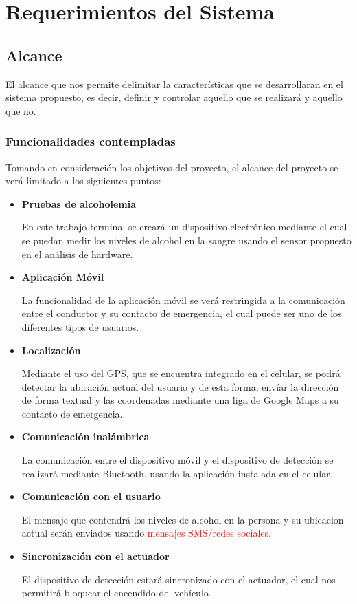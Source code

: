 \section{Requerimientos del Sistema}
\subsection{Alcance}
El alcance que nos permite delimitar la características que se desarrollaran en el sistema propuesto, es decir,
definir y controlar aquello que se realizará y aquello que no.
	\subsubsection{Funcionalidades contempladas}
	Tomando en consideración los objetivos del proyecto, el alcance del proyecto se verá limitado a los siguientes puntos: \par
		\begin{itemize}
			 \item {\textbf{Pruebas de alcoholemia} \par En este trabajo terminal se creará un dispositivo electrónico mediante el cual se puedan medir los niveles de alcohol en la sangre usando el sensor propuesto en el análisis de hardware.}
			 \item {\textbf{Aplicación Móvil} \par La funcionalidad de la aplicación móvil se verá restringida a la comunicación entre el conductor y su contacto de emergencia, el cual puede ser uno de los diferentes tipos de usuarios.}
			 \item {\textbf{Localización} \par Mediante el uso del GPS, que se encuentra integrado en el celular, se podrá detectar la ubicación actual del usuario y de esta forma, envíar la dirección de forma textual y las coordenadas mediante una liga de Google Maps a su contacto de emergencia.}
			 \item {\textbf{Comunicación inalámbrica} \par La comunicación entre el dispositivo móvil y el dispositivo de detección se realizará mediante Bluetooth, usando la aplicación instalada en el celular.}
 			\item {\textbf{Comunicación con el usuario} \par El mensaje que contendrá los niveles de alcohol en la persona y su ubicacion actual serán enviados usando \textcolor{red}{mensajes SMS/redes sociales.}}
 			\item{\textbf{Sincronización con el actuador} \par El dispositivo de detección estará sincronizado con el actuador, el cual nos permitirá bloquear el encendido del vehículo.}
		\end{itemize}
